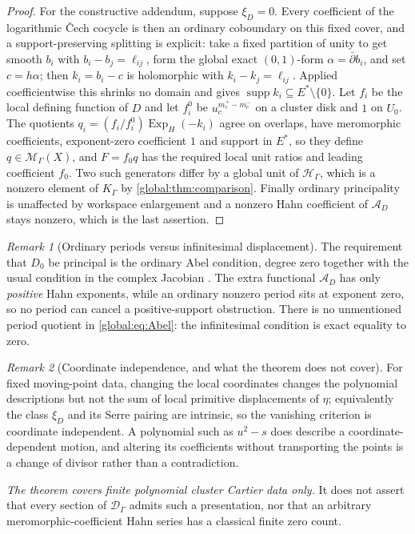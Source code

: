 \documentclass[11pt,letterpaper]{article}
\theoremstyle{definition}
\theoremstyle{remark}
\newtheorem{remark}[remark]{Remark}
\newcommand{\HH}{\mathscr H_\Gamma}
\newcommand{\KK}{K_\Gamma}
\newcommand{\supp}{\operatorname{supp}}
\newcommand{\ExpH}{\operatorname{Exp}_{H}}
\newcommand{\MG}{\mathscr M_\Gamma}
\newcommand{\DG}{\mathscr D_\Gamma}
\numberwithin{equation}{section}
\begin{document}
\begin{proof}
For the constructive addendum, suppose $\xi_D=0$. Every coefficient of the logarithmic \v Cech cocycle is then an ordinary coboundary on this fixed cover, and a support-preserving splitting is explicit: take a fixed partition of unity to get smooth $b_i$ with $b_i-b_j=\ell_{ij}$, form the global exact $(0,1)$-form $\alpha=\bar\partial b_i$, and set $c=h\alpha$; then $k_i=b_i-c$ is holomorphic with $k_i-k_j=\ell_{ij}$. Applied coefficientwise this shrinks no domain and gives $\supp k_i\subseteq E^*\setminus\{0\}$. Let $f_i$ be the local defining function of $D$ and let $f^0_i$ be $u_c^{m_c^+-m_c^-}$ on a cluster disk and $1$ on $U_0$. The quotients $q_i=(f_i/f^0_i)\ExpH(-k_i)$ agree on overlaps, have meromorphic coefficients, exponent-zero coefficient $1$ and support in $E^*$, so they define $q\in\MG(X)$, and $F=f_0q$ has the required local unit ratios and leading coefficient $f_0$. Two such generators differ by a global unit of $\HH$, which is a nonzero element of $\KK$ by \cref{global:thm:comparison}. Finally ordinary principality is unaffected by workspace enlargement and a nonzero Hahn coefficient of $\mathcal A_D$ stays nonzero, which is the last assertion.
\end{proof}

\begin{remark}[Ordinary periods versus infinitesimal displacement]\label{global:rem:periods}
The requirement that $D_0$ be principal is the ordinary Abel condition, degree zero together with the usual condition in the complex Jacobian \cite{Narasimhan}. The extra functional $\mathcal A_D$ has only \emph{positive} Hahn exponents, while an ordinary nonzero period sits at exponent zero, so no period can cancel a positive-support obstruction. There is no unmentioned period quotient in \eqref{global:eq:Abel}: the infinitesimal condition is exact equality to zero.
\end{remark}

\begin{remark}[Coordinate independence, and what the theorem does not cover]\label{global:rem:abelscope}
For fixed moving-point data, changing the local coordinates changes the polynomial descriptions but not the sum of local primitive displacements of $\eta$; equivalently the class $\xi_D$ and its Serre pairing are intrinsic, so the vanishing criterion is coordinate independent. A polynomial such as $u^2-s$ does describe a coordinate-dependent motion, and altering its coefficients without transporting the points is a change of divisor rather than a contradiction.

\emph{The theorem covers finite polynomial cluster Cartier data only.} It does not assert that every section of $\DG$ admits such a presentation, nor that an arbitrary meromorphic-coefficient Hahn series has a classical finite zero count.
\end{remark}
\end{document}

